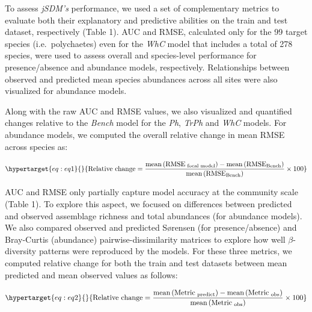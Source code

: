 \begin{refsection}
To assess \emph{jSDM's} performance, we used a set of complementary
metrics to evaluate both their explanatory and predictive abilities on
the train and test dataset, respectively (Table 1). AUC and RMSE,
calculated only for the 99 target species (i.e.~polychaetes) even for
the \emph{WhC} model that includes a total of 278 species, were used to
assess overall and species-level performance for presence/absence and
abundance models, respectively. Relationships between observed and
predicted mean species abundances across all sites were also visualized
for abundance models.

Along with the raw AUC and RMSE values, we also visualized and
quantified changes relative to the \emph{Bench} model for the \emph{Ph},
\emph{TrPh} and \emph{WhC} models. For abundance models, we computed the
overall relative change in mean RMSE across species as:

\begin{equation}\protect\hypertarget{eq:eq1}{}{\text{Relative change} = \frac{\text{mean}\left(\text{RMSE}_{\text{ focal model}}\right) - \text{mean}\left(\text{RMSE}_{\text{Bench}}\right)}{\text{mean}\left(\text{RMSE}_{\text{Bench}}\right)} \times 100}\label{eq:eq1}\end{equation}

AUC and RMSE only partially capture model accuracy at the community
scale (Table 1). To explore this aspect, we focused on differences
between predicted and observed assemblage richness and total abundances
(for abundance models). We also compared observed and predicted Sørensen
(for presence/absence) and Bray-Curtis (abundance)
pairwise-dissimilarity matrices to explore how well \(\beta\)-diversity
patterns were reproduced by the models. For these three metrics, we
computed relative change for both the train and test datasets between
mean predicted and mean observed values as follows:

\begin{equation}\protect\hypertarget{eq:eq2}{}{\text{Relative change} = \frac{\text{mean}\left(\text{Metric}_{\text{ predict}}\right) - \text{mean}\left(\text{Metric}_{\text{ obs}}\right)}{\text{mean}\left(\text{Metric}_{\text{ obs}}\right)} \times 100}\label{eq:eq2}\end{equation}


\end{refsection}
